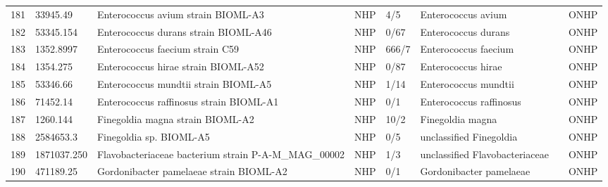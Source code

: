 \begin{longtable}{llllllll}
181 &      33945.49 &                                       Enterococcus avium strain BIOML-A3 &   NHP &       4/5 &                             Enterococcus avium &                \cite{poyet2019library,gilmore2014enterococci} &  ONHP \\
182 &     53345.154 &                                     Enterococcus durans strain BIOML-A46 &   NHP &      0/67 &                            Enterococcus durans &                       \cite{poyet2019library,ryu2019clinical} &  ONHP \\
183 &     1352.8997 &                                          Enterococcus faecium strain C59 &   NHP &     666/7 &                           Enterococcus faecium &                                   \cite{zhou2020enterococcus} &  ONHP \\
184 &      1354.275 &                                      Enterococcus hirae strain BIOML-A52 &   NHP &      0/87 &                             Enterococcus hirae &                       \cite{poyet2019library,peng2017genomic} &  ONHP \\
185 &      53346.66 &                                     Enterococcus mundtii strain BIOML-A5 &   NHP &      1/14 &                           Enterococcus mundtii &          \cite{poyet2019library,higashide2005endophthalmitis} &  ONHP \\
186 &      71452.14 &                                  Enterococcus raffinosus strain BIOML-A1 &   NHP &       0/1 &                        Enterococcus raffinosus &        \cite{poyet2019library,freyaldenhoven2005enterococcus} &  ONHP \\
187 &      1260.144 &                                         Finegoldia magna strain BIOML-A2 &   NHP &      10/2 &                               Finegoldia magna &                 \cite{poyet2019library,neumann2020finegoldia} &  ONHP \\
188 &     2584653.3 &                                                  Finegoldia sp. BIOML-A5 &   NHP &       0/5 &                        unclassified Finegoldia &                     \cite{poyet2019library,bruggemann2018pan} &  ONHP \\
189 &   1871037.250 &                     Flavobacteriaceae bacterium strain P-A-M\_MAG\_00002 &   NHP &       1/3 &                 unclassified Flavobacteriaceae &                                     \cite{cao2018comparative} &  ONHP \\
190 &     471189.25 &                                  Gordonibacter pamelaeae strain BIOML-A2 &   NHP &       0/1 &                        Gordonibacter pamelaeae &                          \cite{poyet2019library,woo2010first} &  ONHP \\

\end{longtable}
